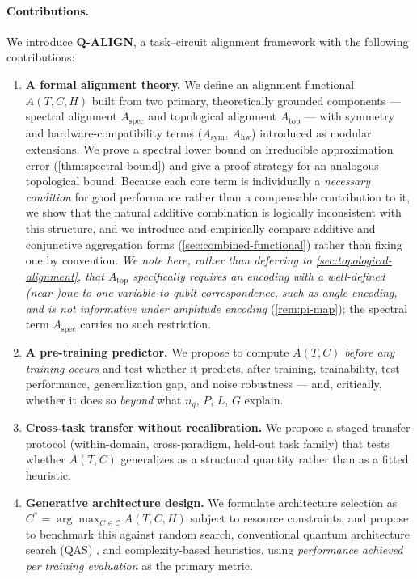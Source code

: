 \documentclass[11pt]{article}
\newcommand{\Aspec}{A_{\mathrm{spec}}}
\newcommand{\Atop}{A_{\mathrm{top}}}
\newcommand{\Asym}{A_{\mathrm{sym}}}
\newcommand{\Ahw}{A_{\mathrm{hw}}}
\begin{document}
\paragraph{Contributions.} We introduce \textbf{Q-ALIGN}, a task--circuit alignment framework with the following contributions:
\begin{enumerate}[label=(C\arabic*), leftmargin=2.2em]
    \item \textbf{A formal alignment theory.} We define an alignment functional $A(T,C,H)$ built from two primary, theoretically grounded components --- spectral alignment $\Aspec$ and topological alignment $\Atop$ --- with symmetry and hardware-compatibility terms ($\Asym$, $\Ahw$) introduced as modular extensions. We prove a spectral lower bound on irreducible approximation error (\cref{thm:spectral-bound}) and give a proof strategy for an analogous topological bound. Because each core term is individually a \emph{necessary condition} for good performance rather than a compensable contribution to it, we show that the natural additive combination is logically inconsistent with this structure, and we introduce and empirically compare additive and conjunctive aggregation forms (\cref{sec:combined-functional}) rather than fixing one by convention. \emph{We note here, rather than deferring to \cref{sec:topological-alignment}, that $\Atop$ specifically requires an encoding with a well-defined (near-)one-to-one variable-to-qubit correspondence, such as angle encoding, and is not informative under amplitude encoding} (\cref{rem:pi-map}); the spectral term $\Aspec$ carries no such restriction.
    \item \textbf{A pre-training predictor.} We propose to compute $A(T,C)$ \emph{before any training occurs} and test whether it predicts, after training, trainability, test performance, generalization gap, and noise robustness --- and, critically, whether it does so \emph{beyond} what $n_q$, $P$, $L$, $G$ explain.
    \item \textbf{Cross-task transfer without recalibration.} We propose a staged transfer protocol (within-domain, cross-paradigm, held-out task family) that tests whether $A(T,C)$ generalizes as a structural quantity rather than as a fitted heuristic.
    \item \textbf{Generative architecture design.} We formulate architecture selection as $C^\ast = \arg\max_{C \in \mathcal{C}} A(T,C,H)$ subject to resource constraints, and propose to benchmark this against random search, conventional quantum architecture search (QAS) \citep{du2022quantum,zhang2022differentiable,ostaszewski2021reinforcement}, and complexity-based heuristics, using \emph{performance achieved per training evaluation} as the primary metric.
\end{enumerate}
\end{document}
